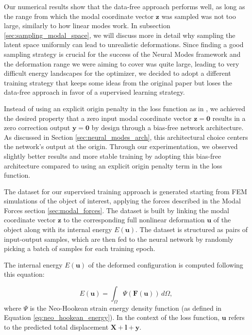 Our numerical results show that the data-free approach performs well, as long as the range from which the modal coordinate vector \( \mathbf{z} \) was sampled was not too large, similarly to how linear modes work. In subsection \ref{sec:sampling_modal_space}, we will discuss more in detail why sampling the latent space uniformly can lead to unrealistic deformations. Since finding a good sampling strategy is crucial for the success of the Neural Modes framework and the deformation range we were aiming to cover was quite large, leading to very difficult energy landscapes for the optimizer, we decided to adopt a different training strategy that keeps some ideas from the original paper but loses the data-free approach in favor of a supervised learning strategy.

Instead of using an explicit origin penalty in the loss function as in \cite{Wang_Du_Coros_Thomaszewski_2024}, we achieved the desired property that a zero input modal coordinate vector \( \mathbf{z}=\bm{0} \) results in a zero correction output \( \bm{y}=\bm{0} \) by design through a bias-free network architecture. As discussed in Section \ref{sec:neural_modes_arch}, this architectural choice centers the network's output at the origin. Through our experimentation, we observed slightly better results and more stable training by adopting this bias-free architecture compared to using an explicit origin penalty term in the loss function.

The dataset for our supervised training approach is generated starting from FEM simulations of the object of interest, applying the forces described in the Modal Forces section \ref{sec:modal_forces}. The dataset is built by linking the modal coordinate vector \( \mathbf{z} \) to the corresponding full nonlinear deformation \( \bm{u} \) of the object along with its internal energy \( E(\bm{u}) \). The dataset is structured as pairs of input-output samples, which are then fed to the neural network by randomly picking a batch of samples for each training epoch.

The internal energy \( E(\bm{u}) \) of the deformed configuration is computed following this equation:


\begin{equation}
    E(\bm{u}) = \int_{\Omega} \Psi(\bm{F}(\bm{u})) \, d\Omega,
\end{equation}
where $\Psi$ is the Neo-Hookean strain energy density function (as defined in Equation \eqref{eq:neo_hookean_energy}). In the context of the loss function, $\bm{u}$ refers to the predicted total displacement $\bm{X} + \bm{l} + \bm{y}$.



